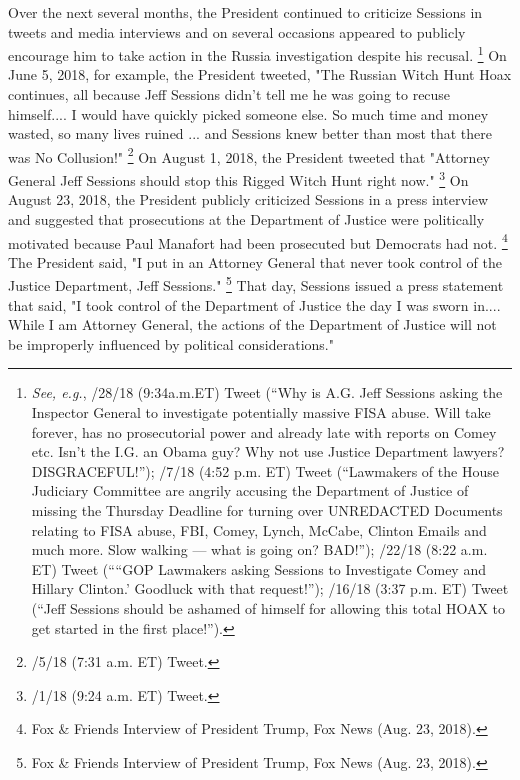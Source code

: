 Over the next several months, the President continued to criticize Sessions in tweets and media interviews and on several occasions appeared to publicly encourage him to take action in the Russia investigation despite his recusal.%
\footnote{\textit{See, e.g.}, /28/18 (9:34a.m.ET) Tweet (“Why is A.G. Jeff Sessions asking the Inspector General to investigate potentially massive FISA abuse.
Will take forever, has no prosecutorial power and already late with reports on Comey etc.
Isn’t the I.G. an Obama guy?
Why not use Justice Department lawyers?
DISGRACEFUL!”);
/7/18 (4:52 p.m. ET) Tweet (“Lawmakers of the House Judiciary Committee are angrily accusing the Department of Justice of missing the Thursday Deadline for turning over UNREDACTED Documents relating to FISA abuse, FBI, Comey, Lynch, McCabe, Clinton Emails and much more.
Slow walking — what is going on? BAD!”);
/22/18 (8:22 a.m. ET) Tweet (““GOP Lawmakers asking Sessions to Investigate Comey and Hillary Clinton.’ \@FoxNews Goodluck with that request!”);
/16/18 (3:37 p.m. ET) Tweet (“Jeff Sessions should be ashamed of himself for allowing this total HOAX to get started in the first place!”).}
On June 5, 2018, for example, the President tweeted, "The Russian Witch Hunt Hoax continues, all because Jeff Sessions didn't tell me he was going to recuse himself.... I would have quickly picked someone else.
So much time and money wasted, so many lives ruined ... and Sessions knew better than most that there was No Collusion!"%
\footnote{/5/18 (7:31 a.m. ET) Tweet.}
On August 1, 2018, the President tweeted that "Attorney General Jeff Sessions should stop this Rigged Witch Hunt right now."%
\footnote{/1/18 (9:24 a.m. ET) Tweet.}
On August 23, 2018, the President publicly criticized Sessions in a press interview and suggested that prosecutions at the Department of Justice were politically motivated because Paul Manafort had been prosecuted but Democrats had not.%
\footnote{Fox \& Friends Interview of President Trump, Fox News (Aug. 23, 2018).}
The President said, "I put in an Attorney General that never took control of the Justice Department, Jeff Sessions."%
\footnote{Fox \& Friends Interview of President Trump, Fox News (Aug. 23, 2018).}
That day, Sessions issued a press statement that said, "I took control of the Department of Justice the day I was sworn in....
While I am Attorney General, the actions of the Department of Justice will not be improperly influenced by political considerations."%
